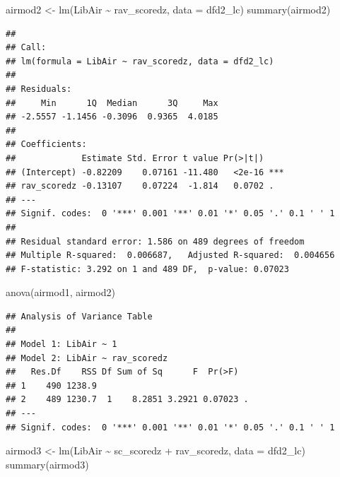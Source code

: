 \documentclass[
]{article}
\newenvironment{Shaded}{\begin{snugshade}}{\end{snugshade}}
\newcommand{\AttributeTok}[1]{\textcolor[rgb]{0.77,0.63,0.00}{#1}}
\newcommand{\FunctionTok}[1]{\textcolor[rgb]{0.00,0.00,0.00}{#1}}
\newcommand{\NormalTok}[1]{#1}
\newcommand{\OtherTok}[1]{\textcolor[rgb]{0.56,0.35,0.01}{#1}}
\newcommand{\SpecialCharTok}[1]{\textcolor[rgb]{0.00,0.00,0.00}{#1}}
\begin{document}
\begin{Shaded}
\begin{Highlighting}[]
\NormalTok{airmod2 }\OtherTok{\textless{}{-}} \FunctionTok{lm}\NormalTok{(LibAir }\SpecialCharTok{\textasciitilde{}}\NormalTok{ rav\_scoredz, }\AttributeTok{data =}\NormalTok{ dfd2\_lc)}
\FunctionTok{summary}\NormalTok{(airmod2)}
\end{Highlighting}
\end{Shaded}

\begin{verbatim}
## 
## Call:
## lm(formula = LibAir ~ rav_scoredz, data = dfd2_lc)
## 
## Residuals:
##     Min      1Q  Median      3Q     Max 
## -2.5557 -1.1456 -0.3096  0.9365  4.0185 
## 
## Coefficients:
##             Estimate Std. Error t value Pr(>|t|)    
## (Intercept) -0.82209    0.07161 -11.480   <2e-16 ***
## rav_scoredz -0.13107    0.07224  -1.814   0.0702 .  
## ---
## Signif. codes:  0 '***' 0.001 '**' 0.01 '*' 0.05 '.' 0.1 ' ' 1
## 
## Residual standard error: 1.586 on 489 degrees of freedom
## Multiple R-squared:  0.006687,   Adjusted R-squared:  0.004656 
## F-statistic: 3.292 on 1 and 489 DF,  p-value: 0.07023
\end{verbatim}

\begin{Shaded}
\begin{Highlighting}[]
\FunctionTok{anova}\NormalTok{(airmod1, airmod2)}
\end{Highlighting}
\end{Shaded}

\begin{verbatim}
## Analysis of Variance Table
## 
## Model 1: LibAir ~ 1
## Model 2: LibAir ~ rav_scoredz
##   Res.Df    RSS Df Sum of Sq      F  Pr(>F)  
## 1    490 1238.9                              
## 2    489 1230.7  1    8.2851 3.2921 0.07023 .
## ---
## Signif. codes:  0 '***' 0.001 '**' 0.01 '*' 0.05 '.' 0.1 ' ' 1
\end{verbatim}

\begin{Shaded}
\begin{Highlighting}[]
\NormalTok{airmod3 }\OtherTok{\textless{}{-}} \FunctionTok{lm}\NormalTok{(LibAir }\SpecialCharTok{\textasciitilde{}}\NormalTok{ sc\_scoredz }\SpecialCharTok{+}\NormalTok{ rav\_scoredz, }\AttributeTok{data =}\NormalTok{ dfd2\_lc)}
\FunctionTok{summary}\NormalTok{(airmod3)}
\end{Highlighting}
\end{Shaded}
\end{document}
